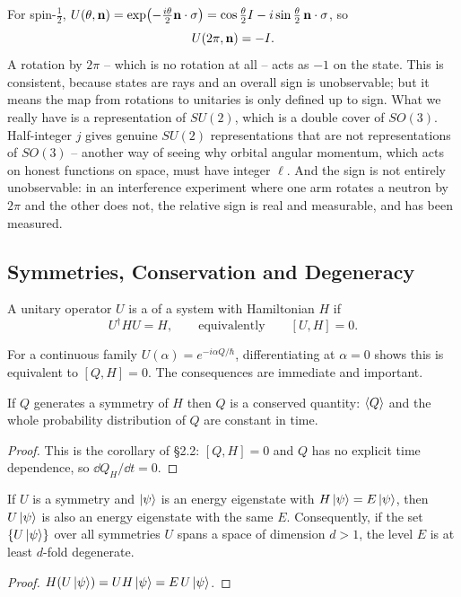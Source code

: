\documentclass[a4paper]{scrartcl}
\begin{document}
\begin{remark}
    For spin-$\frac12$, $U(\theta, \mathbf{n}) = \exp(-\frac{i\theta}{2}\mathbf{n} \cdot \mathbf{\sigma}) = \cos\frac\theta2 I - i \sin\frac\theta2 \,\mathbf{n}\cdot\mathbf{\sigma}$, so
    $$
    U(2\pi, \mathbf{n}) = -I.
    $$
    A rotation by $2\pi$ -- which is no rotation at all -- acts as $-1$ on the state. This is consistent, because states are rays and an overall sign is unobservable; but it means the map from rotations to unitaries is only defined up to sign. What we really have is a representation of $SU(2)$, which is a double cover of $SO(3)$. Half-integer $j$ gives genuine $SU(2)$ representations that are not representations of $SO(3)$ -- another way of seeing why orbital angular momentum, which acts on honest functions on space, must have integer $\ell$. And the sign is not entirely unobservable: in an interference experiment where one arm rotates a neutron by $2\pi$ and the other does not, the relative sign is real and measurable, and has been measured.
\end{remark}

\subsection{Symmetries, Conservation and Degeneracy}

\begin{definition}[Symmetry]
    A unitary operator $U$ is a  of a system with Hamiltonian $H$ if
    $$
    U^\dagger H U = H, \qquad \text{equivalently} \qquad [U, H] = 0.
    $$
\end{definition}

For a continuous family $U(\alpha) = e^{-i\alpha Q/\hbar}$, differentiating at $\alpha = 0$ shows this is equivalent to $[Q, H] = 0$. The consequences are immediate and important.

\begin{theorem}
    If $Q$ generates a symmetry of $H$ then $Q$ is a conserved quantity: $\expval{Q}$ and the whole probability distribution of $Q$ are constant in time.
\end{theorem}
\begin{proof}
    This is the corollary of \S2.2: $[Q,H] = 0$ and $Q$ has no explicit time dependence, so $\dd Q_H/\dd t = 0$.
\end{proof}

\begin{theorem}
    If $U$ is a symmetry and $\ket\psi$ is an energy eigenstate with $H\ket\psi = E\ket\psi$, then $U\ket\psi$ is also an energy eigenstate with the same $E$. Consequently, if the set $\{U\ket\psi\}$ over all symmetries $U$ spans a space of dimension $d > 1$, the level $E$ is at least $d$-fold degenerate.
\end{theorem}
\begin{proof}
    $H(U\ket\psi) = UH\ket\psi = E \, U\ket\psi$.
\end{proof}
\end{document}

